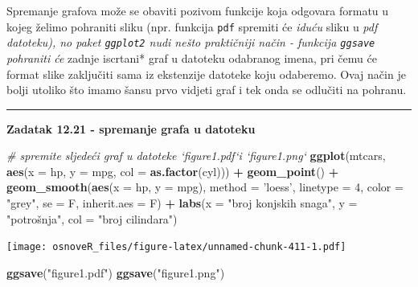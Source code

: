 \documentclass[]{book}
\newenvironment{Shaded}{\begin{snugshade}}{\end{snugshade}}
\newcommand{\KeywordTok}[1]{\textcolor[rgb]{0.13,0.29,0.53}{\textbf{#1}}}
\newcommand{\DataTypeTok}[1]{\textcolor[rgb]{0.13,0.29,0.53}{#1}}
\newcommand{\DecValTok}[1]{\textcolor[rgb]{0.00,0.00,0.81}{#1}}
\newcommand{\StringTok}[1]{\textcolor[rgb]{0.31,0.60,0.02}{#1}}
\newcommand{\CommentTok}[1]{\textcolor[rgb]{0.56,0.35,0.01}{\textit{#1}}}
\newcommand{\OperatorTok}[1]{\textcolor[rgb]{0.81,0.36,0.00}{\textbf{#1}}}
\newcommand{\NormalTok}[1]{#1}
\theoremstyle{definition}
\theoremstyle{definition}
\theoremstyle{definition}
\theoremstyle{remark}
\begin{document}
Spremanje grafova može se obaviti pozivom funkcije koja odgovara formatu
u kojeg želimo pohraniti sliku (npr. funkcija \texttt{pdf} spremiti će
\emph{iduću} sliku u \emph{pdf datoteku), no paket \texttt{ggplot2} nudi
nešto praktičniji način - funkcija \texttt{ggsave} pohraniti će }zadnje
iscrtani* graf u datoteku odabranog imena, pri čemu će format slike
zaključiti sama iz ekstenzije datoteke koju odaberemo. Ovaj način je
bolji utoliko što imamo šansu prvo vidjeti graf i tek onda se odlučiti
na pohranu.

\begin{center}\rule{0.5\linewidth}{\linethickness}\end{center}

\textbf{Zadatak 12.21 - spremanje grafa u datoteku}

\begin{Shaded}
\begin{Highlighting}[]
\CommentTok{# spremite sljedeći graf u datoteke `figure1.pdf`i `figure1.png`}
\KeywordTok{ggplot}\NormalTok{(mtcars, }\KeywordTok{aes}\NormalTok{(}\DataTypeTok{x =}\NormalTok{ hp, }\DataTypeTok{y =}\NormalTok{ mpg, }\DataTypeTok{col =} \KeywordTok{as.factor}\NormalTok{(cyl))) }\OperatorTok{+}\StringTok{ }
\StringTok{  }\KeywordTok{geom_point}\NormalTok{() }\OperatorTok{+}\StringTok{ }
\KeywordTok{geom_smooth}\NormalTok{(}\KeywordTok{aes}\NormalTok{(}\DataTypeTok{x =}\NormalTok{ hp, }\DataTypeTok{y =}\NormalTok{ mpg), }\DataTypeTok{method =} \StringTok{'loess'}\NormalTok{, }
            \DataTypeTok{linetype =} \DecValTok{4}\NormalTok{, }\DataTypeTok{color =} \StringTok{"grey"}\NormalTok{, }\DataTypeTok{se =}\NormalTok{ F, }\DataTypeTok{inherit.aes =}\NormalTok{ F) }\OperatorTok{+}
\KeywordTok{labs}\NormalTok{(}\DataTypeTok{x =} \StringTok{"broj konjskih snaga"}\NormalTok{, }\DataTypeTok{y =} \StringTok{"potrošnja"}\NormalTok{, }\DataTypeTok{col =} \StringTok{"broj cilindara"}\NormalTok{)}
\end{Highlighting}
\end{Shaded}

\texttt{[image: osnoveR\_files/figure-latex/unnamed-chunk-411-1.pdf]}

\begin{Shaded}
\begin{Highlighting}[]
\KeywordTok{ggsave}\NormalTok{(}\StringTok{"figure1.pdf"}\NormalTok{)}
\KeywordTok{ggsave}\NormalTok{(}\StringTok{"figure1.png"}\NormalTok{)}
\end{Highlighting}
\end{Shaded}
\end{document}
